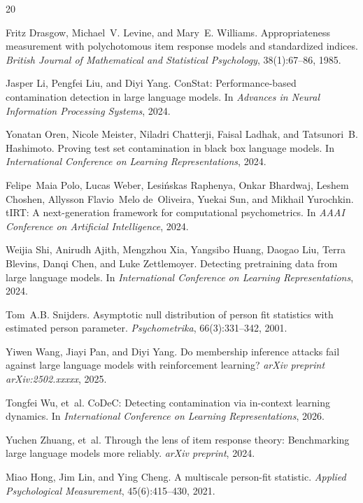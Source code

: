 \documentclass[11pt,a4paper]{article}
\begin{document}
\begin{thebibliography}{20}

Fritz Drasgow, Michael~V. Levine, and Mary~E. Williams.
\newblock Appropriateness measurement with polychotomous item response models and standardized indices.
\newblock \emph{British Journal of Mathematical and Statistical Psychology}, 38(1):67--86, 1985.

Jasper Li, Pengfei Liu, and Diyi Yang.
\newblock Con{S}tat: Performance-based contamination detection in large language models.
\newblock In \emph{Advances in Neural Information Processing Systems}, 2024.

Yonatan Oren, Nicole Meister, Niladri Chatterji, Faisal Ladhak, and Tatsunori~B. Hashimoto.
\newblock Proving test set contamination in black box language models.
\newblock In \emph{International Conference on Learning Representations}, 2024.

Felipe~Maia Polo, Lucas Weber, Lesi\'{n}skas Raphenya, Onkar Bhardwaj, Leshem Choshen, Allysson Flavio~Melo de~Oliveira, Yuekai Sun, and Mikhail Yurochkin.
\newblock t{IRT}: A next-generation framework for computational psychometrics.
\newblock In \emph{AAAI Conference on Artificial Intelligence}, 2024.

Weijia Shi, Anirudh Ajith, Mengzhou Xia, Yangsibo Huang, Daogao Liu, Terra Blevins, Danqi Chen, and Luke Zettlemoyer.
\newblock Detecting pretraining data from large language models.
\newblock In \emph{International Conference on Learning Representations}, 2024.

Tom~A.B. Snijders.
\newblock Asymptotic null distribution of person fit statistics with estimated person parameter.
\newblock \emph{Psychometrika}, 66(3):331--342, 2001.

Yiwen Wang, Jiayi Pan, and Diyi Yang.
\newblock Do membership inference attacks fail against large language models with reinforcement learning?
\newblock \emph{arXiv preprint arXiv:2502.xxxxx}, 2025.

Tongfei Wu, et~al.
\newblock Co{D}e{C}: Detecting contamination via in-context learning dynamics.
\newblock In \emph{International Conference on Learning Representations}, 2026.

Yuchen Zhuang, et~al.
\newblock Through the lens of item response theory: Benchmarking large language models more reliably.
\newblock \emph{arXiv preprint}, 2024.

Miao Hong, Jim Lin, and Ying Cheng.
\newblock A multiscale person-fit statistic.
\newblock \emph{Applied Psychological Measurement}, 45(6):415--430, 2021.

\end{thebibliography}
\end{document}
